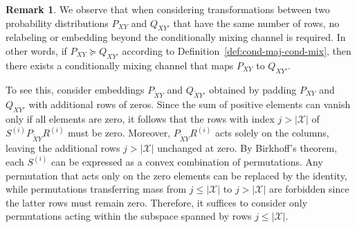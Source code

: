 \documentclass[aps,pra,11pt,onecolumn,nofootinbib,tightenlines]{revtex4-2}
\theoremstyle{definition}
\newtheorem{remark}[theorem]{Remark}
\begin{document}
\begin{remark}
\label{remark: no isometries}
We observe that when considering transformations between two probability distributions \(P_{XY}\) and \(Q_{XY'}\) that have the same number of rows, no relabeling or embedding beyond the conditionally mixing channel is required. In other words, if \(P_{XY} \succeq Q_{XY'}\) according to Definition~\ref{def:cond-maj-cond-mix}, then there exists a conditionally mixing channel that maps \(P_{XY}\) to \(Q_{XY'}\). 

To see this, consider embeddings \(P_{\widetilde{X}Y}\) and \(Q_{\widetilde{X}Y'}\) obtained by padding \(P_{XY}\) and \(Q_{XY'}\) with additional rows of zeros. Since the sum of positive elements can vanish only if all elements are zero, it follows that the rows with index \(j > |\mathcal{X}|\) of $S^{(i)} P_{\widetilde{X}Y} R^{(i)}$
must be zero. Moreover, \(P_{\widetilde{X}Y} R^{(i)}\) acts solely on the columns, leaving the additional rows \(j > |\mathcal{X}|\) unchanged at zero. By Birkhoff's theorem, each \(S^{(i)}\) can be expressed as a convex combination of permutations. Any permutation that acts only on the zero elements can be replaced by the identity, while permutations transferring mass from \(j \leq |\mathcal{X}|\) to \(j > |\mathcal{X}|\) are forbidden since the latter rows must remain zero. Therefore, it suffices to consider only permutations acting within the subspace spanned by rows \(j \leq |\mathcal{X}|\).
\end{remark}
\end{document}
